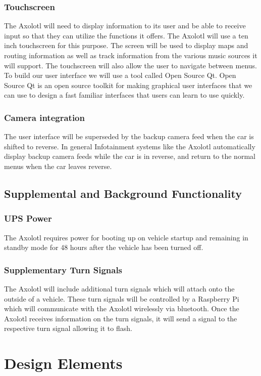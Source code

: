 \documentclass[onecolumn, draftclsnofoot,10pt, compsoc]{IEEEtran}
\begin{document}
\subsubsection{Touchscreen}
The Axolotl will need to display information to its user and be able to receive input so that they can utilize the functions it offers. The Axolotl will use a ten inch touchscreen for this purpose. The screen will be used to display maps and routing information as well as track information from the various music sources it will support. The touchscreen will also allow the user to navigate between menus. To build our user interface we will use a tool called Open Source Qt. Open Source Qt is an open source toolkit for making graphical user interfaces that we can use to design a fast familiar interfaces that users can learn to use quickly.
\subsubsection{Camera integration}
The user interface will be superseded by the backup camera feed when the car is shifted to reverse. In general Infotainment systems like the Axolotl automatically display backup camera feeds while the car is in reverse, and return to the normal menus when the car leaves reverse. 

\subsection{Supplemental and Background Functionality}
\subsubsection{UPS Power}
The Axolotl requires power for booting up on vehicle startup and remaining in standby mode for 48 hours after the vehicle has been turned off. 

\subsubsection{Supplementary Turn Signals}
The Axolotl will include additional turn signals which will attach onto the outside of a vehicle. These turn signals will be controlled by a Raspberry Pi which will communicate with the Axolotl wirelessly via bluetooth. Once the Axolotl receives information on the turn signals, it will send a signal to the respective turn signal allowing it to flash. 

\newpage
\section{Design Elements}
\end{document}
